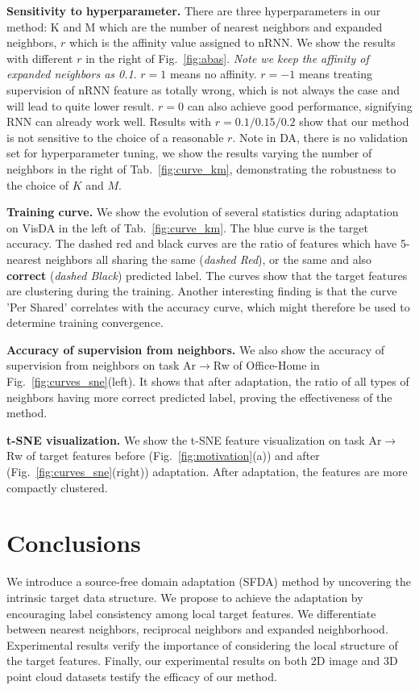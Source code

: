 \documentclass{article}
\begin{document}
\noindent \textbf{Sensitivity to hyperparameter.} There are three hyperparameters in our method: K and M which are the number of nearest neighbors and expanded neighbors, $r$ which is the affinity value assigned to nRNN. We show the results with different $r$ in the right of Fig.~\ref{fig:abas}. \textit{Note we keep the affinity of expanded neighbors as 0.1}. $r=1$ means no affinity. $r=-1$ means treating supervision of nRNN feature as totally wrong, which is not always the case and will lead to quite lower result. $r=0$ can also achieve good performance, signifying RNN can already work well. Results with $r=0.1/0.15/0.2$ show that our method is not sensitive to the choice of a reasonable $r$.
{Note in DA, there is no validation set for hyperparameter tuning, we show the results varying the number of neighbors in the right of Tab.~\ref{fig:curve_km}, demonstrating the robustness to the choice of $K$ and $M$.}

\noindent \textbf{Training curve.} We show the evolution of several statistics during adaptation on VisDA in the left of Tab.~\ref{fig:curve_km}. The blue curve is the target accuracy. The dashed red and black curves are the ratio of features which have 5-nearest neighbors all sharing the same (\textit{dashed Red}), or the same and also \textbf{correct} (\textit{dashed Black}) predicted label. The curves show that the target features are clustering during the training. {Another interesting finding is that the curve 'Per Shared' correlates with the accuracy curve, which might therefore be used to determine training convergence.}

\noindent \textbf{Accuracy of supervision from neighbors.} We also show the accuracy of supervision from neighbors on task Ar$\rightarrow$Rw of Office-Home
in Fig.~\ref{fig:curves_sne}(left). 
It shows that after adaptation, the ratio of all types of neighbors having more correct predicted label, proving the effectiveness of the method.

\noindent \textbf{t-SNE visualization.} We show the t-SNE feature visualization on task Ar$\rightarrow$Rw of target features before (Fig.~\ref{fig:motivation}(a)) and after (Fig.~\ref{fig:curves_sne}(right)) adaptation. After adaptation, the features are more compactly clustered.


\section{Conclusions}


We introduce a source-free domain adaptation (SFDA) method by uncovering the intrinsic target data structure. We propose to achieve the adaptation by encouraging label consistency among local target features. We differentiate between nearest neighbors, reciprocal neighbors and expanded neighborhood. Experimental results verify the importance of considering the local structure of the target features. Finally, our experimental results on both 2D image and 3D point cloud datasets testify the efficacy of our method.
\end{document}
